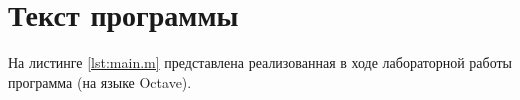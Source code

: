 \chapter{Текст программы}

На листинге \ref{lst:main.m} представлена реализованная в ходе лабораторной работы программа (на языке Octave).


\clearpage